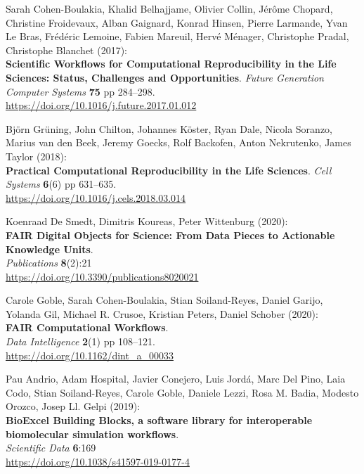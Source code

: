 \begin{thebibliography}{9}
Sarah Cohen-Boulakia, Khalid Belhajjame, Olivier Collin, Jérôme
Chopard, Christine Froidevaux, Alban Gaignard, Konrad Hinsen, Pierre
Larmande, Yvan Le Bras, Frédéric Lemoine, Fabien Mareuil, Hervé Ménager,
Christophe Pradal, Christophe Blanchet (2017):\\
\textbf{Scientific Workflows for Computational Reproducibility in the
Life Sciences: Status, Challenges and Opportunities}. \emph{Future
Generation Computer Systems} \textbf{75} pp 284--298.\\
\url{https://doi.org/10.1016/j.future.2017.01.012}

Björn Grüning, John Chilton, Johannes Köster, Ryan Dale, Nicola
Soranzo, Marius van den Beek, Jeremy Goecks, Rolf Backofen, Anton
Nekrutenko, James Taylor (2018):\\
\textbf{Practical Computational Reproducibility in the Life Sciences}.
\emph{Cell Systems} \textbf{6}(6) pp 631--635.\\
\url{https://doi.org/10.1016/j.cels.2018.03.014}


Koenraad De Smedt, Dimitris Koureas, Peter Wittenburg (2020):\\
\textbf{FAIR Digital Objects for Science: From Data Pieces to Actionable
Knowledge Units}.\\
\emph{Publications} \textbf{8}(2):21\\
\url{https://doi.org/10.3390/publications8020021}

Carole Goble, Sarah Cohen-Boulakia, Stian Soiland-Reyes, Daniel
Garijo, Yolanda Gil, Michael R. Crusoe, Kristian Peters, Daniel Schober
(2020):\\
\textbf{FAIR Computational Workflows}.\\
\emph{Data Intelligence} \textbf{2}(1) pp 108--121.\\
\url{https://doi.org/10.1162/dint_a_00033}

Pau Andrio, Adam Hospital, Javier Conejero, Luis Jordá, Marc
Del Pino, Laia Codo, Stian Soiland-Reyes, Carole Goble, Daniele Lezzi,
Rosa M. Badia, Modesto Orozco, Josep Ll. Gelpi (2019):\\
\textbf{BioExcel Building Blocks, a software library for interoperable
biomolecular simulation workflows}.\\
\emph{Scientific Data} \textbf{6}:169\\
\url{https://doi.org/10.1038/s41597-019-0177-4}


\end{thebibliography}
